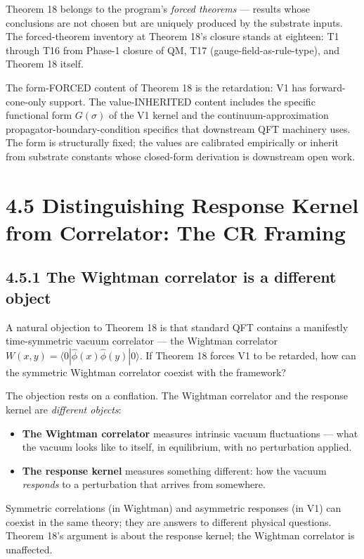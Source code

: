 \documentclass[11pt]{book}
\begin{document}
Theorem 18 belongs to the program's \textit{forced theorems} — results whose conclusions are not chosen but are uniquely produced by the substrate inputs. The forced-theorem inventory at Theorem 18's closure stands at eighteen: T1 through T16 from Phase-1 closure of QM, T17 (gauge-field-as-rule-type), and Theorem 18 itself.

The form-FORCED content of Theorem 18 is the retardation: V1 has forward-cone-only support. The value-INHERITED content includes the specific functional form $G(\sigma)$ of the V1 kernel and the continuum-approximation propagator-boundary-condition specifics that downstream QFT machinery uses. The form is structurally fixed; the values are calibrated empirically or inherit from substrate constants whose closed-form derivation is downstream open work.

\section{4.5 Distinguishing Response Kernel from Correlator: The CR Framing}

\subsection{4.5.1 The Wightman correlator is a different object}

A natural objection to Theorem 18 is that standard QFT contains a manifestly time-symmetric vacuum correlator — the Wightman correlator $W(x,y) = \langle 0 | \hat{\phi}(x) \hat{\phi}(y) | 0 \rangle$. If Theorem 18 forces V1 to be retarded, how can the symmetric Wightman correlator coexist with the framework?

The objection rests on a conflation. The Wightman correlator and the response kernel are \textit{different objects}:

\begin{itemize}
\item \textbf{The Wightman correlator} measures intrinsic vacuum fluctuations — what the vacuum looks like to itself, in equilibrium, with no perturbation applied.
\item \textbf{The response kernel} measures something different: how the vacuum \textit{responds} to a perturbation that arrives from somewhere.
\end{itemize}

Symmetric correlations (in Wightman) and asymmetric responses (in V1) can coexist in the same theory; they are answers to different physical questions. Theorem 18's argument is about the response kernel; the Wightman correlator is unaffected.
\end{document}
